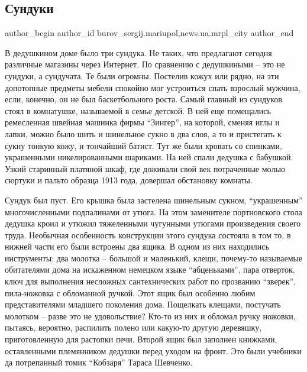  
 
 
 
 
 
\subsection{Сундуки}
\label{sec:07_10_2017.stz.news.ua.mrpl_city.1.sunduki}
 
\ifcmt
 author_begin
   author_id burov_sergij.mariupol,news.ua.mrpl_city
 author_end
\fi

В дедушкином доме было три сундука. Не таких, что предлагают сегодня различные
магазины через Интернет. По сравнению с дедушкиными – это не сундуки, а
сундучата. Те были огромны. Постелив кожух или рядно, на эти допотопные
предметы мебели спокойно мог устроиться спать взрослый мужчина, если, конечно,
он не был баскетбольного роста. Самый главный из сундуков стоял в комнатушке,
называемой в семье детской. В ней  еще помещались ремесленная швейная машинка
фирмы \enquote{Зингер}, на которой, сменяя иглы и лапки, можно было шить и шинельное
сукно в два слоя, а то и пристегать к сукну тонкую кожу, и тончайший батист.
Тут же были кровать со спинками, украшенными никелированными шариками. На ней
спали дедушка с бабушкой. Узкий старинный платяной шкаф, где доживали свой век
потраченные молью сюртуки и пальто  образца 1913 года, довершал обстановку
комнаты.

Сундук был пуст. Его крышка была застелена шинельным сукном, \enquote{украшенным}
многочисленными подпалинами от утюга. На этом заменителе портновского стола
дедушка кроил и утюжил тяжеленными чугунными утюгами произведения своего труда.
Необычная особенность конструкции этого сундука состояла в том то, в нижней
части его были встроены два ящика. В одном из них находились инструменты: два
молотка – большой и маленький, клещи, почему-то называемые обитателями дома на
искаженном немецком языке \enquote{абценьками}, пара отверток, ключ для выполнения
несложных сантехнических работ по прозванию \enquote{зверек}, пила-ножовка с обломанной
ручкой. Этот ящик был особенно любим представителями младшего поколения дома.
Пощелкать клещами, постучать молотком – разве это не удовольствие? Кто-то из
них и обломал ручку ножовки, пытаясь, вероятно, распилить полено или какую-то
другую деревяшку, приготовленную для растопки печи. Второй ящик был заполнен
книжками, оставленными племянником дедушки перед уходом на фронт. Это были
учебники да потрепанный томик \enquote{Кобзаря} Тараса Шевченко.

